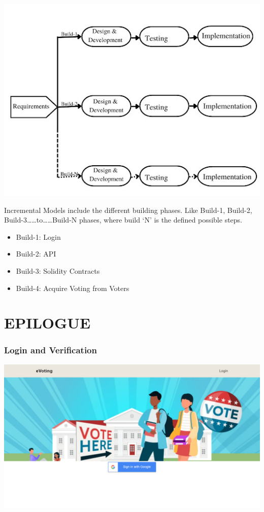 \documentclass[a4paper,12pt]{report}
\begin{document}
\includegraphics[scale=0.5]{images/DevModel.jpg} 

Incremental Models include the different building phases. Like Build-1, Build-2, Build-3……to……Build-N phases, where build ‘N’ is the defined possible steps.
\begin{itemize}
  \item Build-1: Login
  \item Build-2: API
  \item Build-3: Solidity Contracts
  \item Build-4: Acquire Voting from Voters
\end{itemize}
\chapter{EPILOGUE}

\subsection{Login and Verification}
               \includegraphics[scale=0.25]{images/Epilog-2.png} 
               
\end{document}
